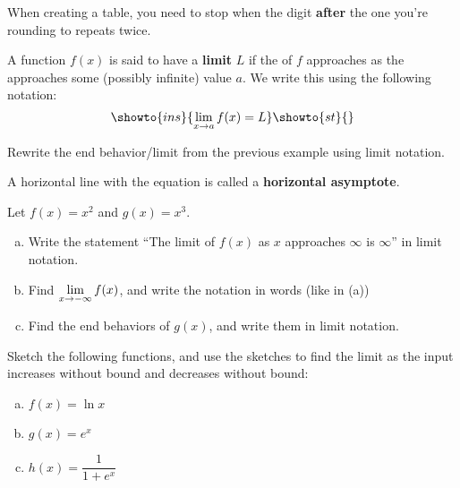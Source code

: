 \documentclass[notes]{subfiles}
\begin{document}
		\begin{rmk}[Note]
			When creating a table, you need to stop when the digit \textbf{after} the one you're rounding to repeats twice.
		\end{rmk}
		\begin{defn}[Limit]
			A function $f(x)$ is said to have a \textbf{limit} $L$ if the  of $f$\fitb{}{\\[15pt]} approaches  as the  approaches some (possibly infinite) value $a$.  We write this using the following notation:\\[15pt]
				\[
					\showto{ins}{\ds \lim_{x\to a} f(x) = L}
					\showto{st}{\vspace*{.15in}}
				\]
		\end{defn}
			\newpage

		\begin{ex}
			Rewrite the end behavior/limit from the previous example using limit notation.
		\end{ex}
		\begin{defn}
			A horizontal line with the equation  is called a \textbf{horizontal asymptote}.
		\end{defn}
		\begin{ex}
			Let $f(x) = x^2$ and $g(x) = x^3$. 
			\begin{enumerate}[(a)]
				\item Write the statement ``The limit of $f(x)$ as $x$ approaches $\infty$ is $\infty$'' in limit notation.
				\item Find $\displaystyle \lim_{x\to -\infty} f(x)$, and write the notation in words (like in (a))
				\item Find the end behaviors of $g(x)$, and write them in limit notation.
			\end{enumerate}
		\end{ex}
			\newpage
		\begin{ex}
			Sketch the following functions, and use the sketches to find the limit as the input increases without bound and decreases without bound:
			\begin{enumerate}[(a)]
				\item $f(x) = \ln x$
					\vs{1}
				\item $g(x) = e^x$
					\vs{1}
				\item $h(x) = \dfrac{1}{1 + e^x}$
					\vs{1}
			\end{enumerate}
		\end{ex}
			\newpage
			
\end{document}
